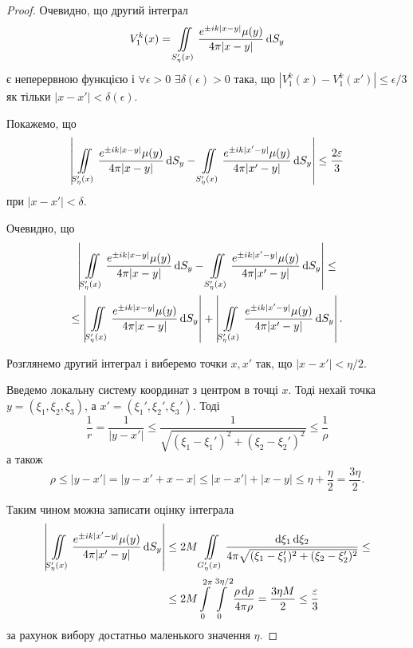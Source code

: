 \begin{proof}
	Очевидно, що другий інтеграл
	\begin{equation}
		V_1^k(x) = \displaystyle\iint\limits_{S_\eta'(x)} \frac{e^{\pm i k |x - y|} \mu(y)}{4 \pi |x - y|} \mathop{}\!\mathrm{d} S_y
	\end{equation}
	є неперервною функцією і $\forall \epsilon > 0$ $\exists \delta(\epsilon) > 0$ така, що $|V_1^k(x) - V_1^k(x')| \le \epsilon/3$ як тільки $|x - x'| < \delta(\epsilon)$. \medskip

	Покажемо, що
	\begin{equation}
		\left| \displaystyle\iint\limits_{S_\eta'(x)} \frac{e^{\pm i k |x - y|} \mu(y)}{4 \pi |x - y|} \mathop{}\!\mathrm{d} S_y -  \displaystyle\iint\limits_{S_\eta'(x)} \frac{e^{\pm i k |x' - y|} \mu(y)}{4 \pi |x' - y|} \mathop{}\!\mathrm{d} S_y \right| \le \frac{2 \varepsilon}{3}
	\end{equation}
	при $|x - x'| < \delta$. \medskip

	Очевидно, що
	\begin{multline}
		\left| \displaystyle\iint\limits_{S_\eta'(x)} \frac{e^{\pm i k |x - y|} \mu(y)}{4 \pi |x - y|} \mathop{}\!\mathrm{d} S_y -  \displaystyle\iint\limits_{S_\eta'(x)} \frac{e^{\pm i k |x' - y|} \mu(y)}{4 \pi |x' - y|} \mathop{}\!\mathrm{d} S_y \right| \le \\
		\le \left| \displaystyle\iint\limits_{S_\eta'(x)} \frac{e^{\pm i k |x - y|} \mu(y)}{4 \pi |x - y|} \mathop{}\!\mathrm{d} S_y \right| + \left| \displaystyle\iint\limits_{S_\eta'(x)} \frac{e^{\pm i k |x' - y|} \mu(y)}{4 \pi |x' - y|} \mathop{}\!\mathrm{d} S_y \right|.
	\end{multline}

	Розглянемо другий інтеграл і виберемо точки $x, x'$ так, що $|x - x'| < \eta / 2$. \medskip

	Введемо локальну систему координат з центром в точці $x$. Тоді нехай точка $y = (\xi_1, \xi_2, \xi_3)$, а $x' = (\xi_1', \xi_2', \xi_3')$. Тоді 
	\begin{equation}
		\frac{1}{r} = \frac{1}{|y - x'|} \le \frac{1}{\sqrt{(\xi_1 - \xi_1')^2 + (\xi_2 - \xi_2')^2}} \le \frac{1}{\rho}
	\end{equation}
	а також
	\begin{equation}
		\rho \le |y - x'| = |y - x' + x - x| \le |x - x'| + |x - y| \le \eta + \frac{\eta}{2} = \frac{3 \eta}{2}.
	\end{equation}
 
	Таким чином можна записати оцінку інтеграла
	\begin{equation}
		\begin{aligned}
			\left| \displaystyle\iint\limits_{S_\eta'(x)} \frac{e^{\pm i k |x' - y|} \mu(y)}{4 \pi |x' - y|} \mathop{}\!\mathrm{d} S_y \right| &\le 2 M \displaystyle\iint\limits_{G_\eta'(x)} \frac{\mathop{}\!\mathrm{d} \xi_1 \mathop{}\!\mathrm{d} \xi_2}{4 \pi \sqrt{(\xi_1 - \xi_1')^2 + (\xi_2 - \xi_2')^2}} \le \\
			&\le 2M \displaystyle\int\limits_0^{2\pi} \displaystyle\int\limits_0^{3\eta/2} \frac{\rho \mathop{}\!\mathrm{d} \rho}{4 \pi \rho} = \frac{3 \eta M}{2} \le \frac{\varepsilon}{3}
		\end{aligned}
	\end{equation}
	за рахунок вибору достатньо маленького значення $\eta$. \medskip


\end{proof}

